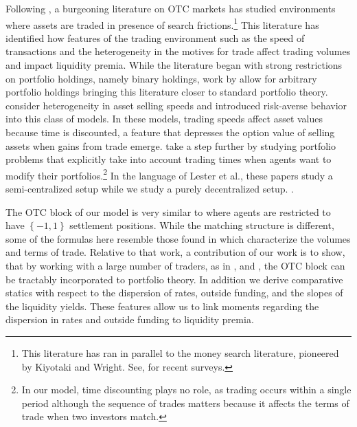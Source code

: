 Following \citet*{Duffie2005}, a burgeoning literature on OTC markets
has studied environments where assets are traded in presence of search
frictions.\footnote{This literature has ran in parallel to the money search literature,
pioneered by Kiyotaki and Wright. See, \citet{williamson_wright_2010_models,Lagos2017}
for recent surveys.} This literature has identified how features of the trading environment
such as the speed of transactions and the heterogeneity in the motives
for trade affect trading volumes and impact liquidity premia. While
the literature began with strong restrictions on portfolio holdings,
namely binary holdings, work by \citet{Lagos2009} allow for arbitrary
portfolio holdings bringing this literature closer to standard portfolio
theory. \citet{HuggonierLesterWeill22} consider heterogeneity in
asset selling speeds and \citet{Uslu2019} introduced risk-averse
behavior into this class of models. In these models, trading speeds
affect asset values because time is discounted, a feature that depresses
the option value of selling assets when gains from trade emerge. \citet{SilvaPassadoreKargar}
take a step further by studying portfolio problems that explicitly
take into account trading times when agents want to modify their portfolios.\footnote{In our model, time discounting plays no role, as trading occurs within
a single period although the sequence of trades matters because it
affects the terms of trade when two investors match.} In the language of Lester et al., these papers study a semi-centralized
setup while we study a purely decentralized setup. .

The OTC block of our model is very similar to \citet*{Afonso2015}
where agents are restricted to have $\left\{ -1,1\right\} $ settlement
positions. While the matching structure is different, some of the
formulas here resemble those found in \citet{Afonso2015} which characterize
the volumes and terms of trade. Relative to that work, a contribution
of our work is to show, that by working with a large number of traders,
as in \citet{Shi1997}, and \citet*{AEW15}, the OTC block can be tractably
incorporated to portfolio theory. In addition we derive comparative
statics with respect to the dispersion of rates, outside funding,
and the slopes of the liquidity yields. These features allow us to
link moments regarding the dispersion in rates and outside funding
to liquidity premia.

